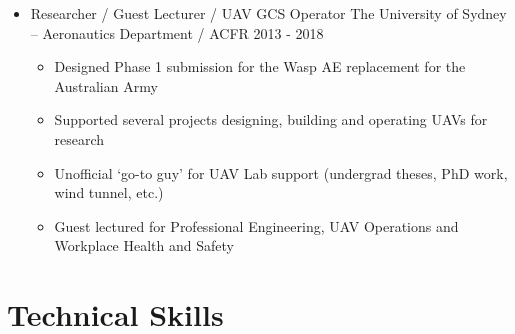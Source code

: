 \documentclass[12pt,letter,sans]{moderncv}        %
\begin{document}
\begin{itemize}
\item{\cventry
    {}
    {Researcher / Guest Lecturer / UAV GCS Operator}
    {The University of Sydney – Aeronautics Department / ACFR}
    {2013 - 2018}
    {}
    {
        \vspace{3pt} 
        \begin{itemize}
            \item Designed Phase 1 submission for the Wasp AE replacement for the Australian Army
            \item Supported several projects designing, building and operating UAVs for research  
            \item Unofficial `go-to guy' for UAV Lab support (undergrad theses, PhD work, wind tunnel, etc.)
            \item Guest lectured for Professional Engineering, UAV Operations and Workplace Health and Safety
        \end{itemize}
        }
    }

%
\end{itemize}

\vspace{4pt}


\section{Technical Skills}
\vspace{4pt}
\end{document}
